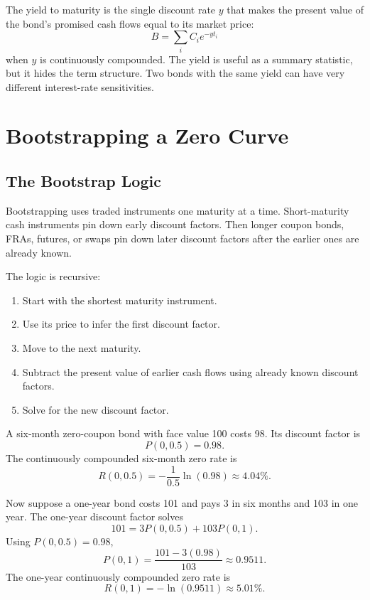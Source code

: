 The yield to maturity is the single discount rate $y$ that makes the present
value of the bond's promised cash flows equal to its market price:
\[
    B=\sum_i C_i e^{-y t_i}
\]
when $y$ is continuously compounded. The yield is useful as a summary statistic,
but it hides the term structure. Two bonds with the same yield can have very
different interest-rate sensitivities.

\section{Bootstrapping a Zero Curve}

\subsection{The Bootstrap Logic}

Bootstrapping uses traded instruments one maturity at a time. Short-maturity
cash instruments pin down early discount factors. Then longer coupon bonds,
FRAs, futures, or swaps pin down later discount factors after the earlier ones
are already known.

The logic is recursive:
\begin{enumerate}
    \item Start with the shortest maturity instrument.
    \item Use its price to infer the first discount factor.
    \item Move to the next maturity.
    \item Subtract the present value of earlier cash flows using already known
    discount factors.
    \item Solve for the new discount factor.
\end{enumerate}

\begin{exmp}
A six-month zero-coupon bond with face value 100 costs 98. Its discount factor
is
\[
    P(0,0.5)=0.98.
\]
The continuously compounded six-month zero rate is
\[
    R(0,0.5)=-\frac{1}{0.5}\ln(0.98)\approx 4.04\%.
\]

Now suppose a one-year bond costs 101 and pays 3 in six months and 103 in one
year. The one-year discount factor solves
\[
    101=3P(0,0.5)+103P(0,1).
\]
Using $P(0,0.5)=0.98$,
\[
    P(0,1)=\frac{101-3(0.98)}{103}\approx 0.9511.
\]
The one-year continuously compounded zero rate is
\[
    R(0,1)=-\ln(0.9511)\approx 5.01\%.
\]
\end{exmp}

